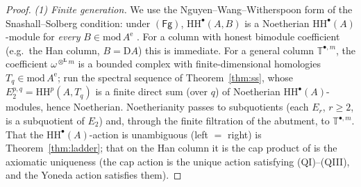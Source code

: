 \documentclass[11pt]{amsart}
\theoremstyle{definition}
\newcommand{\T}{\mathbb{T}}
\newcommand{\HH}{\mathrm{HH}}
\newcommand{\D}{\mathrm{D}}
\newcommand{\Ae}{A^{\mathrm{e}}}
\newcommand{\Lotimes}{\otimes^{\mathbf{L}}}
\newcommand{\Fg}{\mathsf{(Fg)}}
\begin{document}
\begin{proof}
\emph{(1) Finite generation.} We use the Nguyen--Wang--Witherspoon form of the
Snashall--Solberg condition: under $\Fg$, $\HH^\bullet(A,B)$ is a Noetherian
$\HH^\bullet(A)$-module for \emph{every} $B\in\mathrm{mod}\,\Ae$
\cite[Prop.~2.3]{NWW}. For a column with honest bimodule coefficient (e.g.\ the
Han column, $B=\D A$) this is immediate. For a general column
$\T^{\bullet,m}$, the coefficient $\omega^{\Lotimes m}$ is a bounded complex
with finite-dimensional homologies $T_q\in\mathrm{mod}\,\Ae$; run the spectral
sequence of Theorem~\ref{thm:ss}, whose $E_2^{p,q}=\HH^p(A,T_q)$ is a finite
direct sum (over $q$) of Noetherian $\HH^\bullet(A)$-modules, hence Noetherian.
Noetherianity passes to subquotients (each $E_r$, $r\ge2$, is a subquotient of
$E_2$) and, through the finite filtration of the abutment, to
$\T^{\bullet,m}$. That the $\HH^\bullet(A)$-action is unambiguous (left $=$
right) is Theorem~\ref{thm:ladder}; that on the Han column it is the cap
product of \cite{ArmCap} is the axiomatic uniqueness \cite[Theorem 3.1]{ArmCap}
(the cap action is the unique action satisfying (QI)--(QIII), and the Yoneda
action satisfies them).


\end{proof}
\end{document}
